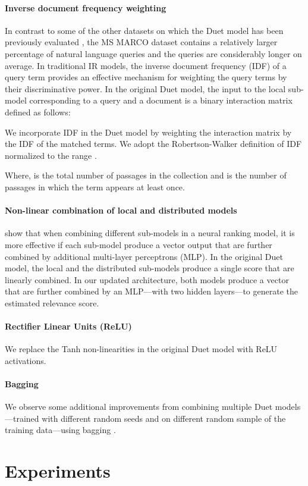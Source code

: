 \documentclass{article}
\begin{document}
\paragraph{Inverse document frequency weighting}
In contrast to some of the other datasets on which the Duet model has been previously evaluated \citep{mitra2016learning, nanni2017benchmark}, the MS MARCO dataset contains a relatively larger percentage of natural language queries and the queries are considerably longer on average.
In traditional IR models, the inverse document frequency (IDF) \citep{robertson2004understanding} of a query term provides an effective mechanism for weighting the query terms by their discriminative power.
In the original Duet model, the input to the local sub-model corresponding to a query  and a document  is a binary interaction matrix  defined as follows:



We incorporate IDF in the Duet model by weighting the interaction matrix by the IDF of the matched terms.
We adopt the Robertson-Walker definition of IDF \citep{jones2000probabilistic} normalized to the range .




Where,  is the total number of passages in the collection and  is the number of passages in which the term  appears at least once.

\paragraph{Non-linear combination of local and distributed models}
\citet{zamani2018neural} show that when combining different sub-models in a neural ranking model, it is more effective if each sub-model produce a vector output that are further combined by additional multi-layer perceptrons (MLP).
In the original Duet model, the local and the distributed sub-models produce a single score that are linearly combined.
In our updated architecture, both models produce a vector that are further combined by an MLP---with two hidden layers---to generate the estimated relevance score.

\paragraph{Rectifier Linear Units (ReLU)}
We replace the Tanh non-linearities in the original Duet model with ReLU \citep{glorot2011deep} activations.

\paragraph{Bagging}
We observe some additional improvements from combining multiple Duet models---trained with different random seeds and on different random sample of the training data---using bagging \citep{breiman1996bagging}. \section{Experiments}
\label{sec:experiment}
\end{document}
